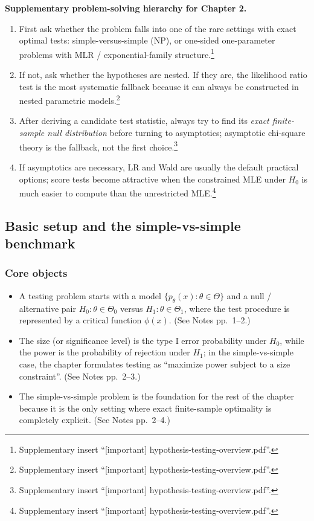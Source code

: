 \begin{mybox}
\textbf{Supplementary problem-solving hierarchy for Chapter 2.}
\begin{enumerate}
    \item First ask whether the problem falls into one of the rare settings with exact optimal tests: simple-versus-simple (NP), or one-sided one-parameter problems with MLR / exponential-family structure.\footnote{Supplementary insert ``[important] hypothesis-testing-overview.pdf''.}
    \item If not, ask whether the hypotheses are nested. If they are, the likelihood ratio test is the most systematic fallback because it can always be constructed in nested parametric models.\footnote{Supplementary insert ``[important] hypothesis-testing-overview.pdf''.}
    \item After deriving a candidate test statistic, always try to find its \emph{exact finite-sample null distribution} before turning to asymptotics; asymptotic chi-square theory is the fallback, not the first choice.\footnote{Supplementary insert ``[important] hypothesis-testing-overview.pdf''.}
    \item If asymptotics are necessary, LR and Wald are usually the default practical options; score tests become attractive when the constrained MLE under $H_0$ is much easier to compute than the unrestricted MLE.\footnote{Supplementary insert ``[important] hypothesis-testing-overview.pdf''.}
\end{enumerate}
\end{mybox}

\subsection{Basic setup and the simple-vs-simple benchmark}
\subsubsection{Core objects}
\begin{itemize}
    \item A testing problem starts with a model $\{p_\theta(x): \theta \in \Theta\}$ and a null / alternative pair $H_0:\theta \in \Theta_0$ versus $H_1:\theta \in \Theta_1$, where the test procedure is represented by a critical function $\phi(x)$. (See Notes pp.~1--2.)
    \item The size (or significance level) is the type I error probability under $H_0$, while the power is the probability of rejection under $H_1$; in the simple-vs-simple case, the chapter formulates testing as ``maximize power subject to a size constraint''. (See Notes pp.~2--3.)
    \item The simple-vs-simple problem is the foundation for the rest of the chapter because it is the only setting where exact finite-sample optimality is completely explicit. (See Notes pp.~2--4.)
\end{itemize}

